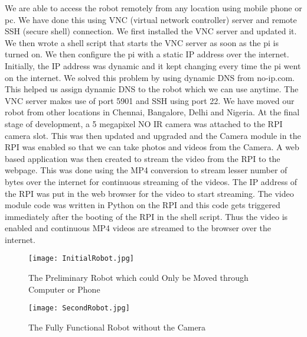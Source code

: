We are able to access the robot remotely from any location using mobile phone or pc. We have done this using VNC (virtual network controller) server and remote SSH (secure shell) connection. We first installed the VNC server and updated it. We then wrote a shell script that starts the VNC server as soon as the pi is turned on. We then configure the pi with a static IP address over the internet. Initially, the IP address was dynamic and it kept changing every time the pi went on the internet. We solved this problem by using dynamic DNS from no-ip.com. This helped us assign dynamic DNS to the robot which we can use anytime. The VNC server makes use of port 5901 and SSH using port 22. We have moved our robot from other locations in Chennai, Bangalore, Delhi and Nigeria. 
At the final stage of development, a 5 megapixel NO IR camera was attached to the RPI camera slot. This was then updated and upgraded and the Camera module in the RPI was enabled so that we can take photos and videos from the Camera. A web based application was then created to stream the video from the RPI to the webpage. This was done using the MP4 conversion to stream lesser number of bytes over the internet for continuous streaming of the videos. The IP address of the RPI was put in the web browser for the video to start streaming. The video module code was written in Python on the RPI and this code gets triggered immediately after the booting of the RPI in the shell script. Thus the video is enabled and continuous MP4 videos are streamed to the browser over the internet.


\begin{figure}[H]
  \centering
  \texttt{[image: InitialRobot.jpg]}
  \caption{The Preliminary Robot which could Only be Moved through Computer or Phone}
  \label{first robot}	
\end{figure}

\begin{figure}[H]
  \centering
  \texttt{[image: SecondRobot.jpg]}
  \caption{The Fully Functional Robot without the Camera}
  \label{second robot}	
\end{figure}



